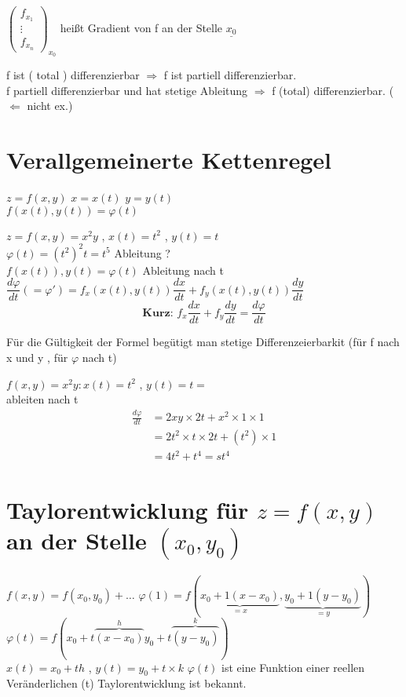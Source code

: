 \begin{remark}
$\begin{pmatrix}
f_{x_1}\\
\vdots\\
f_{x_n}
\end{pmatrix}_{x_0}$ heißt Gradient von f an der Stelle $\underline{x_0}$
\end{remark}
\begin{remark}
f ist ( total ) differenzierbar $\Rightarrow$ f ist partiell differenzierbar.\\
f partiell differenzierbar und hat stetige Ableitung  $\Rightarrow$ f (total) differenzierbar. ($\Leftarrow$ nicht ex.)
\end{remark}
\section{Verallgemeinerte Kettenregel
}
$z = f(x ,y)$ $ x = x(t)  $ $ y = y(t)  $\\
$ f(x(t) , y(t) ) = \varphi(t) $
\begin{example}
$z= f(x,y)= x^2y$ ,  $x(t) = t^2 $
 , $y(t) = t$\\
$\varphi(t)=(t^2)^2 t = t^5 $ Ableitung ?\\
$f(x(t)) , y(t) = \varphi(t) $ Ableitung nach t\\
$\dfrac{d\varphi}{dt}(= \varphi') = f_x(x(t) , y(t)) \dfrac{dx}{dt} +
f_y(x(t) , y(t)) \dfrac{dy}{dt} $\\
\[\textbf{Kurz: } f_x \dfrac{dx}{dt} + f_y \dfrac{dy}{dt} = \dfrac{d \varphi}{dt}   \]
\end{example}
\begin{remark}
Für die Gültigkeit der Formel begütigt man stetige Differenzeierbarkit (für f nach x und y , für $\varphi$ nach t)  
\end{remark}
\begin{example}
$f(x,y)=x^2 y : x(t)=t^2$ , $y(t)=t = $\\
ableiten nach t 
\begin{align*}
\frac{d \varphi}{dt} &= 2xy \times 2t + x^2 \times 1 \times 1 \\
&=2t^2 \times t \times 2t + (t^2) \times 1\\
&= 4t^2 + t^4 = st^4
\end{align*}
\end{example}
\section{Taylorentwicklung für 
$ z = f (x, y)$ an der Stelle $(x_0, y_0)$}
$ f(x,y) = f( x_0 , y_0) + \dots $
$\varphi (1)  = f( \underbrace{ x_0 + 1 (x - x_0)}_{ = x}  , \underbrace{ y_0 +1 (y - y_0)}_{ = y} )$\\
$ \varphi(t) = f (x_0 + t \overbrace{( x - x_0 )}^{h} 
y_0 + t \overbrace{( y - y_0 )}^{k}) $\\
$x(t)=x_0 + th $ , $y(t)= y_0 +t \times k$
$\varphi(t)$ ist eine Funktion einer reellen Veränderlichen (t) Taylorentwicklung ist bekannt. 

